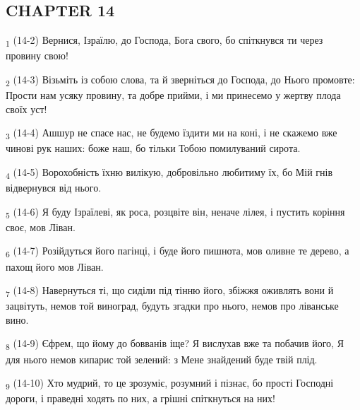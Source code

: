 \subsection{CHAPTER 14}
\begin{tcolorbox}
\textsubscript{1} (14-2) Вернися, Ізраїлю, до Господа, Бога свого, бо спіткнувся ти через провину свою!
\end{tcolorbox}
\begin{tcolorbox}
\textsubscript{2} (14-3) Візьміть із собою слова, та й зверніться до Господа, до Нього промовте: Прости нам усяку провину, та добре прийми, і ми принесемо у жертву плода своїх уст!
\end{tcolorbox}
\begin{tcolorbox}
\textsubscript{3} (14-4) Ашшур не спасе нас, не будемо їздити ми на коні, і не скажемо вже чинові рук наших: боже наш, бо тільки Тобою помилуваний сирота.
\end{tcolorbox}
\begin{tcolorbox}
\textsubscript{4} (14-5) Ворохобність їхню вилікую, добровільно любитиму їх, бо Мій гнів відвернувся від нього.
\end{tcolorbox}
\begin{tcolorbox}
\textsubscript{5} (14-6) Я буду Ізраїлеві, як роса, розцвіте він, неначе лілея, і пустить коріння своє, мов Ліван.
\end{tcolorbox}
\begin{tcolorbox}
\textsubscript{6} (14-7) Розійдуться його пагінці, і буде його пишнота, мов оливне те дерево, а пахощ його мов Ліван.
\end{tcolorbox}
\begin{tcolorbox}
\textsubscript{7} (14-8) Навернуться ті, що сиділи під тінню його, збіжжя оживлять вони й зацвітуть, немов той виноград, будуть згадки про нього, немов про ліванське вино.
\end{tcolorbox}
\begin{tcolorbox}
\textsubscript{8} (14-9) Єфрем, що йому до бовванів іще? Я вислухав вже та побачив його, Я для нього немов кипарис той зелений: з Мене знайдений буде твій плід.
\end{tcolorbox}
\begin{tcolorbox}
\textsubscript{9} (14-10) Хто мудрий, то це зрозуміє, розумний і пізнає, бо прості Господні дороги, і праведні ходять по них, а грішні спіткнуться на них!
\end{tcolorbox}
